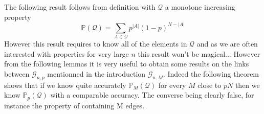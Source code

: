 The following result follows from definition with $\mathcal{Q}$ a monotone increasing property
\begin{equation}
	\mathbb{P}(\mathcal{Q}) = \sum_{A \in \mathcal{Q}} p^{|A|}(1-p)^{N-|A|}
\end{equation}
However this result requires to know all of the elements in $\mathcal{Q}$ and as we are often interested with properties for very large $n$ this result won't be magical... However from the following lemmas it is very useful to obtain some results on the links between $\mathcal{G}_{n, p}$ mentionned in the introduction $\mathcal{G}_{n, M}$.
Indeed the following theorem shows that if we know quite accurately $\mathbb{P}_M(\mathcal{Q})$ for every $M$ close to $pN$ then we know $\mathbb{P}_p(\mathcal{Q})$ with a comparable accuracy. The converse being clearly false, for instance the property of containing M edges.

